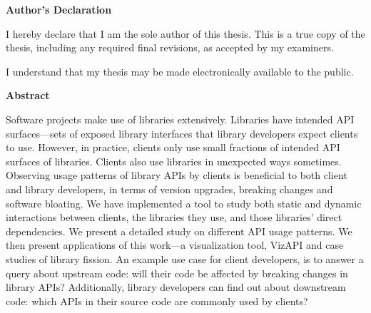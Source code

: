 \cleardoublepage %

\begin{center}\textbf{Author's Declaration}\end{center}
  \noindent
I hereby declare that I am the sole author of this thesis. This is a true copy of the thesis, including any required final revisions, as accepted by my examiners.

  \bigskip
  
  \noindent
I understand that my thesis may be made electronically available to the public.

\cleardoublepage


\begin{center}\textbf{Abstract}\end{center}

Software projects make use of libraries extensively. Libraries have intended API surfaces—sets of exposed library interfaces that library developers expect clients to use. However, in practice, clients only use small fractions of intended API surfaces of libraries. Clients also use libraries in unexpected ways sometimes. Observing usage patterns of library APIs by clients is beneficial to both client and library developers, in terms of version upgrades, breaking changes and software bloating. We have implemented a tool to study both static and dynamic interactions between clients, the libraries they use, and those libraries’ direct dependencies. We present a detailed study on different API usage patterns. We then present applications of this work—a visualization tool, VizAPI and case studies of library fission. An example use case for client developers, is to answer a query about upstream code: will their code be affected by breaking changes in library APIs? Additionally, library developers can find out about downstream code: which APIs in their source code are commonly used by clients? 

\cleardoublepage


